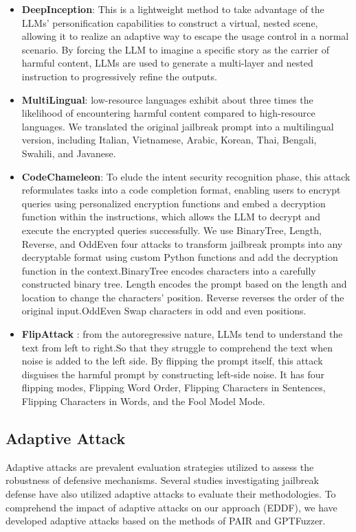 \begin{itemize}
    \item \textbf{DeepInception}\citep{li2023deepinception}: This is a lightweight method to take advantage of the LLMs’ personification capabilities to construct a virtual, nested scene, allowing it to realize an adaptive way to escape the usage control in a normal scenario. By forcing the LLM to imagine a specific story as the carrier of harmful content,  LLMs are used to generate a multi-layer and nested instruction to progressively refine the outputs.
        
    \item \textbf{MultiLingual}\citep{li2023multi}: low-resource languages exhibit about three times the likelihood of encountering harmful content compared to high-resource languages. We translated the original jailbreak prompt into a multilingual version, including Italian, Vietnamese, Arabic, Korean, Thai, Bengali, Swahili, and Javanese. 
        
    \item \textbf{CodeChameleon}\citep{lv2024codechameleon}: To elude the intent security recognition phase, this attack reformulates tasks into a code completion format, enabling users to encrypt queries using personalized encryption functions and embed a decryption function within the instructions, which allows the LLM to decrypt and execute the encrypted queries successfully. We use BinaryTree, Length, Reverse, and OddEven four attacks to transform jailbreak prompts into any decryptable format using custom Python functions and add the decryption function in the context.BinaryTree encodes characters into a carefully constructed binary tree.  Length encodes the prompt based on the length and location to change the characters' position. Reverse reverses the order of the original input.OddEven Swap characters in odd and even positions. 
        
    \item \textbf{FlipAttack} \citep{liu2024flipattack}: from the autoregressive nature, LLMs tend to understand the text from left to right.So that they struggle to comprehend the text when noise is added to the left side. By flipping the prompt itself, this attack disguises the harmful prompt by constructing left-side noise. It has four flipping modes, Flipping Word Order, Flipping Characters in Sentences, Flipping Characters in Words, and the Fool Model Mode. 
    \end{itemize}

\subsection{Adaptive Attack}
\label{sec:appendix A.2}
Adaptive attacks are prevalent evaluation strategies utilized to assess the robustness of defensive mechanisms. Several studies investigating jailbreak defense have also utilized adaptive attacks to evaluate their methodologies. To comprehend the impact of adaptive attacks on our approach (EDDF), we have developed adaptive attacks based on the methods of PAIR and GPTFuzzer. 

